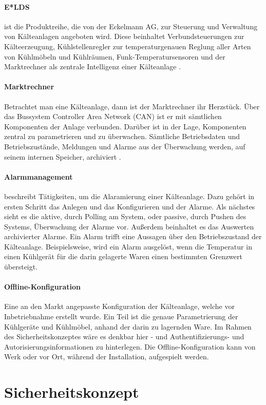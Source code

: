 \documentclass[11pt,a4paper]{report}
\begin{document}
\paragraph{E*LDS} ist die Produktreihe, die von der Eckelmann AG, zur Steuerung und Verwaltung von Kälteanlagen angeboten wird. Diese beinhaltet Verbundsteuerungen zur Kälteerzeugung, Kühlstellenregler zur temperaturgenauen Reglung aller Arten von Kühlmöbeln und Kühlräumen, Funk-Temperatursensoren und der Marktrechner als zentrale Intelligenz einer Kälteanlage \cite{elds}.
\paragraph{Marktrechner} Betrachtet man eine Kälteanlage, dann ist der Marktrechner ihr Herzstück. Über das Bussystem Controller Area Network (CAN) ist er mit sämtlichen Komponenten der Anlage verbunden. Darüber ist in der Lage, Komponenten zentral zu parametrieren und zu überwachen. Sämtliche Betriebsdaten und Betriebszustände, Meldungen und Alarme aus der Überwachung werden, auf seinem internen Speicher, archiviert \cite{elds}.
\paragraph{Alarmmanagement} beschreibt Tätigkeiten, um die Alaramierung einer Kälteanlage. Dazu gehört in ersten Schritt das Anlegen und das Konfigurieren und  der Alarme. Als nächstes sieht es die aktive, durch Polling am System, oder passive, durch Pushen des Systems, Überwachung der Alarme vor. Außerdem beinhaltet es das Auswerten archivierter Alarme. Ein Alarm trifft eine Aussagen über den Betriebszustand der Kälteanlage. Beispielsweise, wird ein Alarm ausgelöst, wenn die Temperatur in einen Kühlgerät für die darin gelagerte Waren einen bestimmten Grenzwert übersteigt.
\paragraph{Offline-Konfiguration} Eine an den Markt angepasste Konfiguration der Kälteanlage, welche vor Inbetriebnahme erstellt wurde. Ein Teil ist die genaue Parametrierung der Kühlgeräte und Kühlmöbel, anhand der darin zu lagernden Ware. Im Rahmen des Sicherheitskonzeptes wäre es denkbar hier - und Authentifizierungs- und  Autorisierungsinformationen zu hinterlegen. Die Offline-Konfiguration kann von Werk oder vor Ort, während der Installation, aufgespielt werden.

\section{Sicherheitskonzept}
\end{document}

